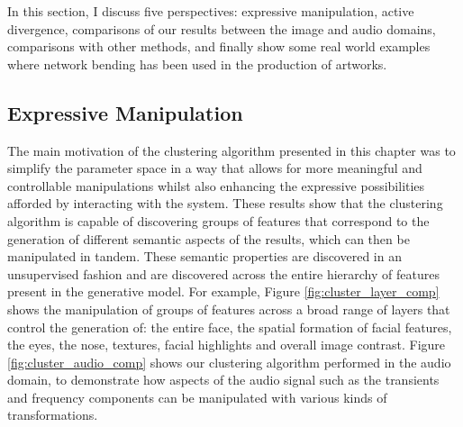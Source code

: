 In this section, I discuss five perspectives: expressive manipulation, active divergence, comparisons of our results between the image and audio domains, comparisons with other methods, and finally show some real world examples where network bending has been used in the production of artworks.

\subsection{Expressive Manipulation}

The main motivation of the clustering algorithm presented in this chapter was to simplify the parameter space in a way that allows for more meaningful and controllable manipulations whilst also enhancing the expressive possibilities afforded by interacting with the system. 
These results show that the clustering algorithm is capable of discovering groups of features that correspond to the generation of different semantic aspects of the results, which can then be manipulated in tandem. 
These semantic properties are discovered in an unsupervised fashion and are discovered across the entire hierarchy of features present in the generative model. 
For example, Figure \ref{fig:cluster_layer_comp} shows the manipulation of groups of features across a broad range of layers that control the generation of: the entire face, the spatial formation of facial features, the eyes, the nose, textures, facial highlights and overall image contrast. Figure \ref{fig:cluster_audio_comp} shows our clustering algorithm performed in the audio domain, to demonstrate how aspects of the audio signal such as the transients and frequency components can be manipulated with various kinds of transformations.

